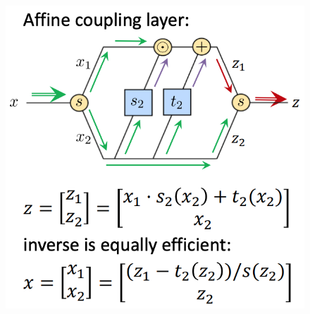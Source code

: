 \begin{frame}
\begin{columns}
        \begin{column}[t]{0.48\textwidth}
            \begin{figure}
                \includegraphics[width=\textwidth]{img/RNVP-basic-layer.png}
            \end{figure} 
        \end{column}
    \end{columns}

\end{frame}